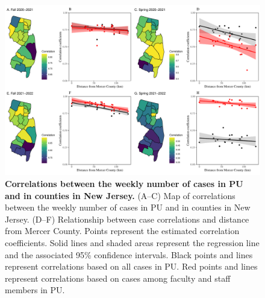 \documentclass[12pt]{article}
\begin{document}
\pagebreak


\begin{figure}[!htp]
\begin{center}
\includegraphics[width=\textwidth]{../figure_princeton_new/figure_princeton_map_new.pdf}
\end{center}
\caption{
\textbf{Correlations between the weekly number of cases in PU and in counties in New Jersey.}
(A--C) Map of correlations between the weekly number of cases in PU and in counties in New Jersey.
(D--F) Relationship between case correlations and distance from Mercer County.
Points represent the estimated correlation coefficients.
Solid lines and shaded areas represent the regression line and the associated 95\% confidence intervals.
Black points and lines represent correlations based on all cases in PU.
Red points and lines represent correlations based on cases among faculty and staff members in PU.
}
\end{figure}


\pagebreak
\end{document}
